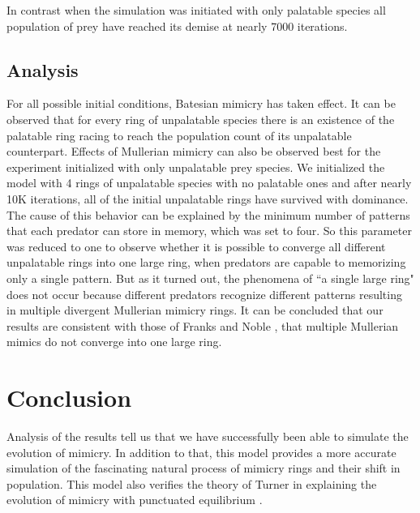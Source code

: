 \documentclass[letterpaper]{article}
\numberwithin{equation}{section}
\begin{document}
In contrast when the simulation was initiated with only palatable species all population of prey have reached its demise at nearly 7000 iterations.

\subsection{Analysis}
For all possible initial conditions, Batesian mimicry has taken effect. It can be observed that for every ring of unpalatable species there is an existence of the palatable ring racing to reach the population count of its unpalatable counterpart. Effects of Mullerian mimicry can also be observed best for the experiment initialized with only unpalatable prey species. We initialized the model with 4 rings of unpalatable species with no palatable ones and after nearly 10K iterations, all of the initial unpalatable rings have survived with dominance. The cause of this behavior can be explained by the minimum number of patterns that each predator can store in memory, which was set to four. So this parameter was reduced to one to observe whether it is possible to converge all different unpalatable rings into one large ring, when predators are capable to memorizing only a single pattern. But as it turned out, the phenomena of ``a single large ring" does not occur because different predators recognize different patterns resulting in multiple divergent Mullerian mimicry rings. It can be concluded that our results are consistent with those of Franks and Noble \citep{franks2003}, that multiple Mullerian mimics do not converge into one large ring.

\section{Conclusion}
\label{section:conclusion}
Analysis of the results tell us that we have successfully been able to simulate the evolution of mimicry. In addition to that, this model provides a more accurate simulation of the fascinating natural process of mimicry rings and their shift in population. This model also verifies the theory of Turner in explaining the evolution of mimicry with punctuated equilibrium \citep{turner1988}.




\printglossaries
{} \label{acronyms}
\end{document}
